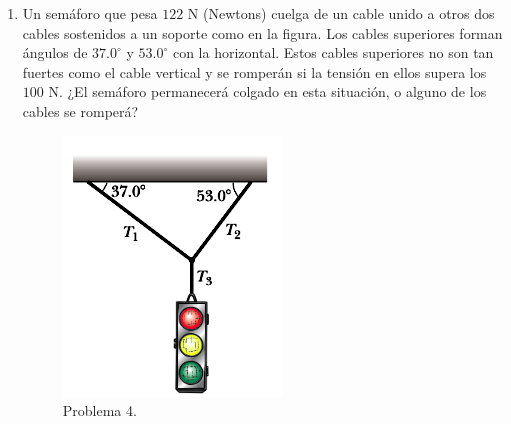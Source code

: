 \documentclass{article}
\begin{document}
\begin{enumerate}
\item Un semáforo que pesa $122$ N (Newtons) cuelga de un cable unido a otros dos cables sostenidos a un soporte como en la figura. Los cables superiores forman ángulos de $37$.$0^{\circ}$ y $53$.$0^{\circ}$ con la horizontal. Estos cables superiores no son tan fuertes como el cable vertical y se romperán si la tensión en ellos supera los
$100$ N. ¿El semáforo permanecerá colgado en esta situación, o alguno de los cables se romperá?

\begin{figure}[H]
\centering
\includegraphics[scale=0.4]{problema_4.png}
\caption{Problema 4.}
\end{figure}

\end{enumerate}
\end{document}
